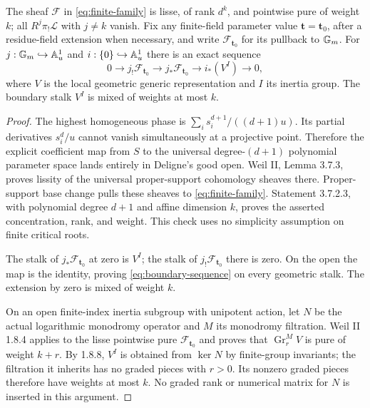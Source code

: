 \begin{proposition}
The sheaf $\mathcal F$ in \eqref{eq:finite-family} is lisse, of rank
$d^k$, and pointwise pure of weight $k$; all $R^j\pi_!\mathcal L$ with
$j\ne k$ vanish.  Fix any finite-field parameter value
$\mathbf t=\mathbf t_0$, after a residue-field extension when necessary,
and write $\mathcal F_{\mathbf t_0}$ for its pullback to ${\mathbb G_m}$.
For $j:{\mathbb G_m}\hookrightarrow\mathbb A^1_u$ and $i:\{0\}\hookrightarrow\mathbb A^1_u$
there is an exact sequence
\begin{equation}
 0\longrightarrow j_!\mathcal F_{\mathbf t_0}
  \longrightarrow j_*\mathcal F_{\mathbf t_0}
  \longrightarrow i_*(V^I)\longrightarrow0,                \label{eq:boundary-sequence}
\end{equation}
where $V$ is the local geometric generic representation and $I$ its
inertia group.  The boundary stalk $V^I$ is mixed of weights at most $k$.
\end{proposition}
\begin{proof}
The highest homogeneous phase is
$\sum_i s_i^{d+1}/((d+1)u)$.  Its partial derivatives $s_i^d/u$
cannot vanish simultaneously at a projective point.  Therefore the
explicit coefficient map from $S$ to the universal degree-$(d+1)$
polynomial parameter space lands entirely in Deligne's good open.
Weil II, Lemma 3.7.3, proves lissity of the universal proper-support
cohomology sheaves there.  Proper-support base change pulls these sheaves
to \eqref{eq:finite-family}.  Statement 3.7.2.3, with polynomial degree
$d+1$ and affine dimension $k$, proves the asserted concentration, rank,
and weight.  This check uses no simplicity assumption on finite critical
roots.

The stalk of $j_*\mathcal F_{\mathbf t_0}$ at zero is $V^I$; the stalk
of $j_!\mathcal F_{\mathbf t_0}$ there is zero.  On the open the map is
the identity, proving \eqref{eq:boundary-sequence} on every geometric
stalk.  The extension by zero is mixed of weight $k$.

On an open finite-index inertia subgroup with unipotent action, let $N$
be the actual logarithmic monodromy operator and $M$ its monodromy
filtration.  Weil II 1.8.4 applies to the lisse pointwise pure
$\mathcal F_{\mathbf t_0}$ and proves that
$\operatorname{Gr}_r^M V$ is pure of weight $k+r$.
By 1.8.8, $V^I$ is obtained from $\ker N$ by finite-group invariants;
the filtration it inherits has no graded pieces with $r>0$.
Its nonzero graded pieces therefore have weights at most $k$.
No graded rank or numerical matrix for $N$ is inserted in this argument.
\end{proof}


